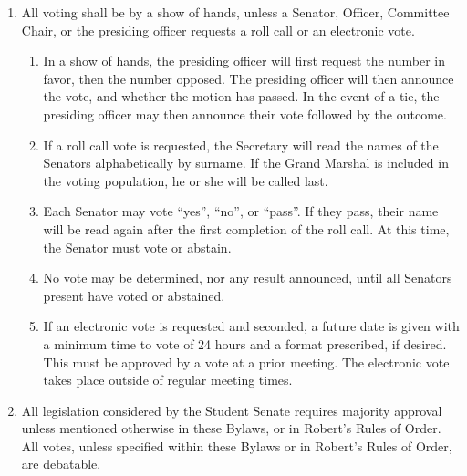 \begin{enumerate}
\item All voting shall be by a show of hands, unless a Senator, Officer, Committee Chair, or the presiding officer requests a roll call or an electronic vote.
\begin{enumerate}
\item In a show of hands, the presiding officer will first request the number in favor, then the number opposed. The presiding
officer will then announce the vote, and whether the motion has passed. In the event of a tie, the presiding officer may then
announce their vote followed by the outcome.
\item If a roll call vote is requested, the Secretary will read the names of the Senators alphabetically by surname. If the Grand
Marshal is included in the voting population, he or she will be called last.
\item Each Senator may vote “yes”, “no”, or “pass”. If they pass, their name will be read again after the first completion of the
roll call. At this time, the Senator must vote or abstain.
\item No vote may be determined, nor any result announced, until all Senators present have voted or abstained.
\item If an electronic vote is requested and seconded, a future date is given with a minimum time to vote of 24 hours and a format prescribed, if desired. This must be approved by a  vote at a prior meeting. The electronic vote takes place outside of regular meeting times.
\end{enumerate}

\item All legislation considered by the Student Senate requires majority approval unless mentioned otherwise in these Bylaws, or in
Robert’s Rules of Order. All votes, unless specified within these Bylaws or in Robert’s Rules of Order, are debatable.
\end{enumerate}
